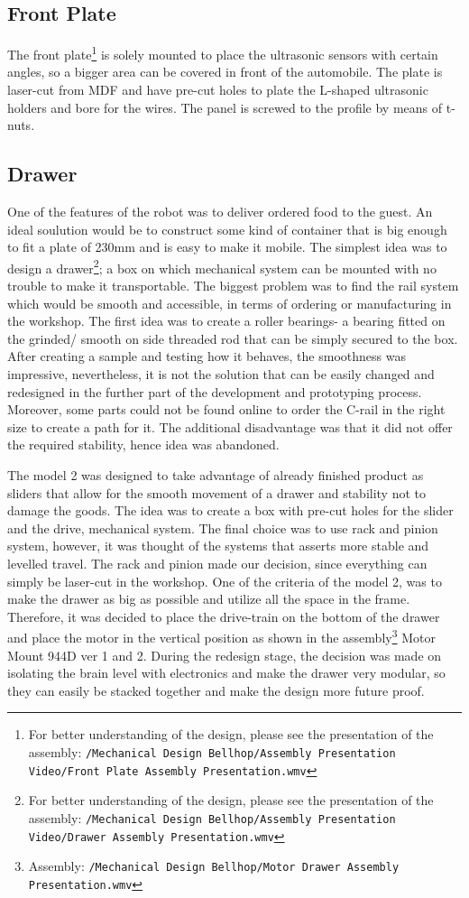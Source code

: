 \documentclass[11pt]{article}
\begin{document}
\subsection*{Front Plate}
The front plate\footnote{For better understanding of the design, please see the presentation of the assembly: \texttt{/Mechanical Design Bellhop/Assembly Presentation Video/Front Plate Assembly Presentation.wmv}} is solely mounted to place the ultrasonic sensors with certain angles, so a bigger area can be covered in front of the automobile. The plate is laser-cut from MDF and have pre-cut holes to plate the L-shaped ultrasonic holders and bore for the wires. The panel is screwed to the profile by means of t-nuts. 


\subsection*{Drawer}
One of the features of the robot was to deliver ordered food to the guest. An ideal soulution would be to construct some kind of container that is big enough to fit a plate of 230mm and is easy to make it mobile. The simplest idea was to design a drawer\footnote{For better understanding of the design, please see the presentation of the assembly: \texttt{/Mechanical Design Bellhop/Assembly Presentation Video/Drawer Assembly Presentation.wmv}}; a box on which mechanical system can be mounted with no trouble to make it transportable. The biggest problem was to find the rail system which would be smooth and accessible, in terms of ordering or manufacturing in the workshop. The first idea was to create a roller bearings- a bearing fitted on the grinded/ smooth on side threaded rod that can be simply secured to the box. After creating a sample and testing how it behaves, the smoothness was impressive, nevertheless, it is not the solution that can be easily changed and redesigned in the further part of the development and prototyping process. Moreover, some parts could not be found online to order the C-rail in the right size to create a path for it. The additional disadvantage was that it did not offer the required stability, hence idea was abandoned. 


The model 2 was designed to take advantage of already finished product as sliders that allow for the smooth movement of a drawer and stability not to damage the goods. The idea was to create a box with pre-cut holes for the slider and the drive, mechanical system. The final choice was to use rack and pinion system, however, it was thought of the systems that asserts more stable and levelled travel. The rack and pinion made our decision, since everything can simply be laser-cut in the workshop. One of the criteria of the model 2, was to make the drawer as big as possible and utilize all the space in the frame. Therefore, it was decided to place the drive-train on the bottom of the drawer and place the motor in the vertical position as shown in the assembly\footnote{Assembly: \texttt{/Mechanical Design Bellhop/Motor Drawer Assembly Presentation.wmv}} Motor Mount 944D ver 1 and 2. During the redesign stage, the decision was made on isolating the brain level with electronics and make the drawer very modular, so they can easily be stacked together and make the design more future proof.
\end{document}
